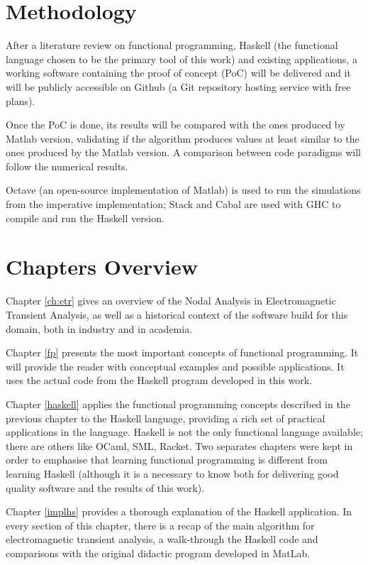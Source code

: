 \section{Methodology}

After a literature review on functional programming, Haskell (the functional language chosen to be the primary tool of this work) and existing applications, a working software containing the proof of concept (PoC) will be delivered and it will be publicly accessible on Github (a Git repository hosting service with free plans).

Once the PoC is done, its results will be compared with the ones produced by Matlab version, validating if the algorithm produces values at least similar to the ones produced by the Matlab version. A comparison between code paradigms will follow the numerical results.

Octave (an open-source implementation of Matlab) is used to run the simulations from the imperative implementation; Stack\cite{stack} and Cabal\cite{cabal} are used with GHC to compile and run the Haskell version. 

\section{Chapters Overview}

Chapter \ref{ch:etr} gives an overview of the Nodal Analysis in Electromagnetic Transient Analysis, as well as a historical context of the software build for this domain, both in industry and in academia.

Chapter \ref{fp} presents the most important concepts of functional programming. It will provide the reader with conceptual examples and possible applications. It uses the actual code from the Haskell program developed in this work.

Chapter \ref{haskell} applies the functional programming concepts described in the previous chapter to the Haskell language, providing a rich set of practical applications in the language. Haskell is not the only functional language available; there are others like OCaml, SML, Racket. Two separates chapters were kept in order to emphasise that learning functional programming is different from learning Haskell (although it is a necessary to know both for delivering good quality software and the results of this work).

Chapter \ref{implhs} provides a thorough explanation of the Haskell application. In every section of this chapter, there is a recap of the main algorithm for electromagnetic transient analysis, a walk-through the Haskell code and comparisons with the original didactic program developed in MatLab.

